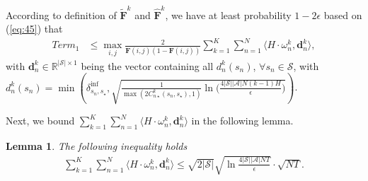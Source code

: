 \documentclass{article} %
\def\eqref#1{equation~\ref{#1}}
\newcommand{\bF}{\mathbf{F}}
\newcommand{\cA}{\mathcal{A}}
\newcommand{\cS}{\mathcal{S}}
\newtheorem{lemma}{Lemma}
\renewcommand{\eqref}[1]{(\ref{#1})}
\begin{document}
{According to definition of $\tilde{\bF}^k$ and $\hat{\bF}^k$, we have at least probability $1-2\epsilon$ based on \eqref{eq:45} that 
\begin{align}\label{eq:term1}
    Term_1&\leq \max_{i,j}\frac{2}{\bF(i,j)(1-\bF(i,j))} \sum_{k=1}^K\sum_{n=1}^N\langle  H\cdot\omega_n^k, \mathbf{d}^k_n \rangle, 
\end{align}
with $\mathbf{d}^k_n\in\mathbb{R}^{|\cS|\times 1}$ being the vector containing all $d_n^k(s_n)$, $\forall s_n\in\cS$, with $d_n^k(s_n) = \min\left(\delta^{\text{inf}}_{s_n, s_{\star}},\sqrt{\frac{1}{\max(2C_{n\star}^k(s_n, s_\star),1)}\ln\!\Big(\frac{4|\cS||\cA|N(k\!-\!1)H}{\epsilon}\Big)}\right)$.







Next, we bound $\sum_{k=1}^K\sum_{n=1}^N\langle  H\cdot\omega_n^k, \mathbf{d}_n^k\rangle$ in the following lemma.
\begin{lemma}\label{lem:10}
The following inequality holds
\begin{align*}
   \sum_{k=1}^K\sum_{n=1}^N\langle  H\cdot\omega_n^k, \mathbf{d}_n^k \rangle \leq
\sqrt{2|\cS|}\sqrt{\ln\frac{4|\cS||\cA|NT}{\epsilon}}\cdot \sqrt{NT}.
\end{align*}
\end{lemma}


}
\end{document}
